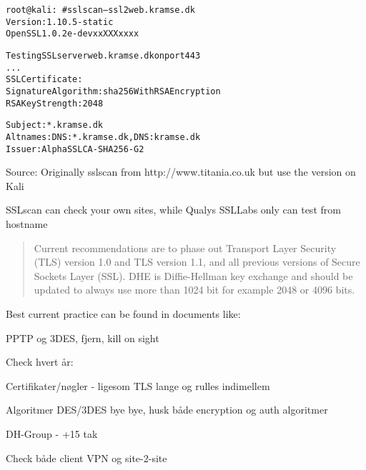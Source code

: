 \documentclass[Screen16to9,17pt]{foils}
\begin{document}

\begin{alltt}\small
root@kali:~# sslscan --ssl2 web.kramse.dk
Version: 1.10.5-static
OpenSSL 1.0.2e-dev xx XXX xxxx

Testing SSL server web.kramse.dk on port 443
...
  SSL Certificate:
Signature Algorithm: sha256WithRSAEncryption
RSA Key Strength:    2048

Subject:  *.kramse.dk
Altnames: DNS:*.kramse.dk, DNS:kramse.dk
Issuer:   AlphaSSL CA - SHA256 - G2
\end{alltt}

Source:
Originally sslscan from http://www.titania.co.uk
 but use the version on Kali

SSLscan can check your own sites, while Qualys SSLLabs only can test from hostname



\begin{quote}
Current recommendations are to phase out Transport Layer Security (TLS) version 1.0 and TLS version 1.1, and all
  previous versions of Secure Sockets Layer (SSL). DHE is Diffie-Hellman key exchange and should be
  updated to always use more than 1024 bit for example 2048 or 4096 bits.

\end{quote}

\begin{list2}
  \item Best current practice can be found in documents like:\\
{\footnotesize
{}}

\end{list2}




\begin{list1}
\item PPTP og 3DES, fjern, kill on sight
\item Check hvert år:
\begin{list2}
\item Certifikater/nøgler - ligesom TLS lange og rulles indimellem
\item Algoritmer DES/3DES bye bye, husk både encryption og auth algoritmer
\item DH-Group - +15 tak
\item Check både client VPN og site-2-site
\end{list2}
\end{list1}
\end{document}
